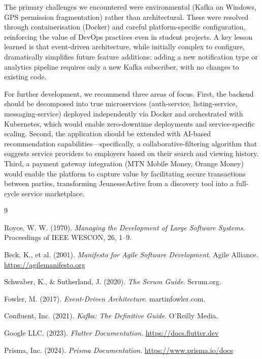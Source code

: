 \documentclass[12pt,a4paper]{report}
\begin{document}
The primary challenges we encountered were environmental (Kafka on Windows, GPS permission fragmentation) rather than architectural. These were resolved through containerisation (Docker) and careful platform-specific configuration, reinforcing the value of DevOps practices even in student projects. A key lesson learned is that event-driven architecture, while initially complex to configure, dramatically simplifies future feature additions: adding a new notification type or analytics pipeline requires only a new Kafka subscriber, with no changes to existing code.

For further development, we recommend three areas of focus. First, the backend should be decomposed into true microservices (auth-service, listing-service, messaging-service) deployed independently via Docker and orchestrated with Kubernetes, which would enable zero-downtime deployments and service-specific scaling. Second, the application should be extended with AI-based recommendation capabilities—specifically, a collaborative-filtering algorithm that suggests service providers to employers based on their search and viewing history. Third, a payment gateway integration (MTN Mobile Money, Orange Money) would enable the platform to capture value by facilitating secure transactions between parties, transforming JeunesseActive from a discovery tool into a full-cycle service marketplace.

\begin{thebibliography}{9}

Royce, W. W. (1970). \textit{Managing the Development of Large Software Systems}. Proceedings of IEEE WESCON, 26, 1--9.

Beck, K., et al. (2001). \textit{Manifesto for Agile Software Development}. Agile Alliance. \url{https://agilemanifesto.org}

Schwaber, K., \& Sutherland, J. (2020). \textit{The Scrum Guide}. Scrum.org.

Fowler, M. (2017). \textit{Event-Driven Architecture}. martinfowler.com.

Confluent, Inc. (2021). \textit{Kafka: The Definitive Guide}. O'Reilly Media.

Google LLC. (2023). \textit{Flutter Documentation}. \url{https://docs.flutter.dev}

Prisma, Inc. (2024). \textit{Prisma Documentation}. \url{https://www.prisma.io/docs}

\end{thebibliography}
\end{document}
